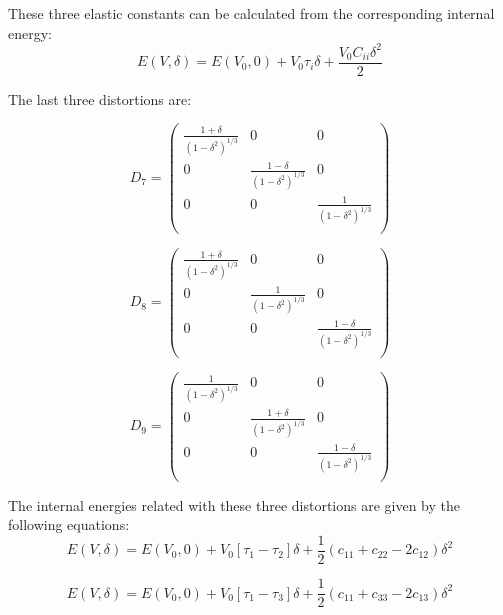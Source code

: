 These three elastic constants can be calculated from the corresponding internal energy:
\begin{equation}
							E(V,\delta) = E(V_0,0) + V_0\tau_i \delta + \frac{V_0C_{ii}\delta^2}{2}
\end{equation}

The last three distortions are:

\begin{equation}\label{eq_D7}
						D_7 = \begin{pmatrix}
						\frac{1+\delta}{(1-\delta^2)^{1/3}} & 0 & 0 \\
						0 & \frac{1-\delta}{(1-\delta^2)^{1/3}} & 0 \\
						0 & 0 & \frac{1}{(1-\delta^2)^{1/3}} \\	
						\end{pmatrix}
\end{equation}			

\begin{equation}\label{eq_D8}
						D_8 =  \begin{pmatrix}
						\frac{1+\delta}{(1-\delta^2)^{1/3}} & 0 & 0 \\
						0 & \frac{1}{(1-\delta^2)^{1/3}} & 0 \\
						0 & 0 & \frac{1-\delta}{(1-\delta^2)^{1/3}} \\
						\end{pmatrix}
\end{equation}	

\begin{equation}\label{eq_D9}
						D_9 = \begin{pmatrix}
						\frac{1}{(1-\delta^2)^{1/3}} & 0 & 0 \\
						0 & \frac{1+\delta}{(1-\delta^2)^{1/3}} & 0 \\
						0 & 0 & \frac{1-\delta}{(1-\delta^2)^{1/3}} \\	
						\end{pmatrix}
\end{equation}

The internal energies related with these three distortions are given by the following equations:
\begin{equation}
E(V,\delta) = E(V_0, 0) + V_0\left [ \tau_1 - \tau_2 \right ] \delta + \frac{1}{2} \left(c_{11} + c_{22} -2c_{12}  \right)\delta^2
\end{equation}

\begin{equation}
E(V,\delta) = E(V_0, 0) + V_0\left [ \tau_1 - \tau_3 \right ] \delta + \frac{1}{2} \left(c_{11} + c_{33} -2c_{13}  \right)\delta^2
\end{equation}

